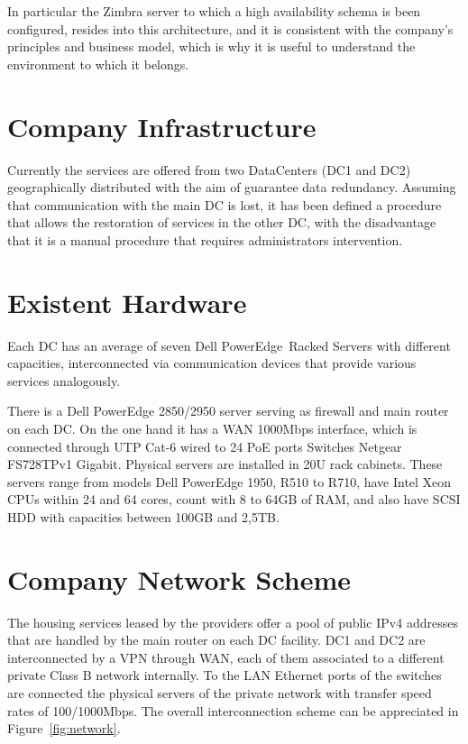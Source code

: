 \documentclass[a4paper, 12pt]{book}
\begin{document}
\noindent In particular the Zimbra server to which a high availability schema is been configured, resides into this architecture, and it is consistent with the company's principles and business model, which is why it is useful to understand the environment to which it belongs.


\section{Company Infrastructure}
\label{sec:infrastructure}

Currently the services are offered from two DataCenters (DC1 and DC2) geographically distributed with the aim of guarantee data redundancy. Assuming that communication with the main DC is lost, it has been defined a procedure that allows the restoration of services in the other DC, with the disadvantage that it is a manual procedure that requires administrators intervention.

\section{Existent Hardware}
\label{sec:hardware}

Each DC has an average of seven Dell PowerEdge\texttrademark \ Racked Servers with different capacities, interconnected via communication devices that provide various services analogously.\bigskip

\noindent There is a Dell PowerEdge 2850/2950 server serving as firewall and main router on each DC. On the one hand it has a WAN 1000Mbps interface, which is connected through UTP Cat-6 wired to 24 PoE ports Switches Netgear FS728TPv1 Gigabit. Physical servers are installed in 20U rack cabinets. These servers range from models Dell PowerEdge 1950, R510 to R710, have Intel Xeon CPUs within 24 and 64 cores, count with 8 to 64GB of RAM, and also have SCSI HDD with capacities between 100GB and 2,5TB.


\section{Company Network Scheme}
\label{sec:networkscheme}

The housing services leased by the providers offer a pool of public IPv4 addresses that are handled by the main router on each DC facility. DC1 and DC2 are interconnected by a VPN through WAN, each of them associated to a different private Class B network internally. To the LAN Ethernet ports of the switches are connected the physical servers of the private network with transfer speed rates of 100/1000Mbps. The overall interconnection scheme can be appreciated in Figure~\ref{fig:network}.
\end{document}
